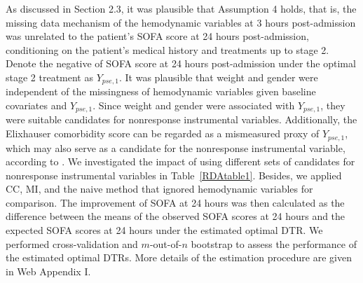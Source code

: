\documentclass[12pt]{article}
\begin{document}
As discussed in Section 2.3, it was plausible that Assumption 4 holds, that is, the missing data mechanism of the hemodynamic variables at 3 hours post-admission was unrelated to the patient’s SOFA score at 24 hours post-admission, conditioning on the patient's medical history and treatments up to stage 2. Denote the negative of SOFA score at 24 hours post-admission under the optimal stage 2 treatment as $Y_{pse,1}$. It was plausible that weight and gender were independent of the missingness of hemodynamic variables given baseline covariates and $Y_{pse,1}$. Since weight and gender were associated with $Y_{pse,1}$,  they were suitable candidates for nonresponse instrumental variables. Additionally, the Elixhauser comorbidity score can be regarded as a mismeasured proxy of $Y_{pse,1}$, which may also serve as a candidate for the nonresponse instrumental variable,  according to \cite{Miao_Tchetgen_2018}. We investigated the impact of using different sets of candidates for nonresponse instrumental variables in Table~\ref{RDAtable1}. Besides, we applied CC, MI, and the naive method that ignored hemodynamic variables for comparison. The improvement of SOFA at 24 hours was then calculated as the difference between the means of the observed  SOFA scores at 24 hours and the expected  SOFA scores at 24 hours under the estimated optimal DTR. 
We performed cross-validation and $m$-out-of-$n$ bootstrap to assess the performance of the estimated optimal DTRs. More details of the estimation procedure are given in Web Appendix I.
\end{document}

